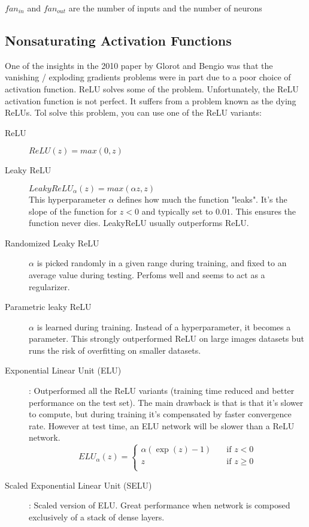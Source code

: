 \documentclass[french]{article}
\begin{document}
$fan_{in}$ and $fan_{out}$ are the number of inputs and the number of neurons

\subsection{Nonsaturating Activation Functions}

One of the insights in the 2010 paper by Glorot and Bengio was that the vanishing / exploding gradients problems were in part due to a poor choice of activation function. ReLU solves some of the problem. Unfortunately, the ReLU activation function is not perfect. It suffers from a problem known as the dying ReLUs. Tol solve this problem, you can use one of the ReLU variants:

\begin{description}
    \item[ReLU] $ReLU(z) = max(0, z)$
    \item[Leaky ReLU] $LeakyReLU_\alpha(z) = max(\alpha z, z)$\\
        This hyperparameter $\alpha$ defines how much the function "leaks". It's the slope of the function for $z < 0$ and typically set to $0.01$. This ensures the function never dies. LeakyReLU usually outperforms ReLU.
    \item[Randomized Leaky ReLU] $\alpha$ is picked randomly in a given range during training, and fixed to an average value during testing. Perfoms well and seems to act as a regularizer.
    \item[Parametric leaky ReLU] $\alpha$ is learned during training. Instead of a hyperparameter, it becomes a parameter. This strongly outperformed ReLU on large images datasets but runs the risk of overfitting on smaller datasets.
    \item[Exponential Linear Unit (ELU)]: Outperformed all the ReLU variants (training time reduced and better performance on the test set). The main drawback is that is that it's slower to compute, but during training it's compensated by faster convergence rate. However at test time, an ELU network will be slower than a ReLU network.
      \[   
      ELU_{\alpha}(z) =
           \begin{cases}
             \alpha (\exp(z) - 1)  &\quad\text{if } z < 0\\
             z &\quad\text{if } z \geq 0 \\
           \end{cases}
      \]
    \item[Scaled Exponential Linear Unit (SELU)]: Scaled version of ELU. Great performance when network is composed exclusively of a stack of dense layers.
\end{description}
\end{document}
